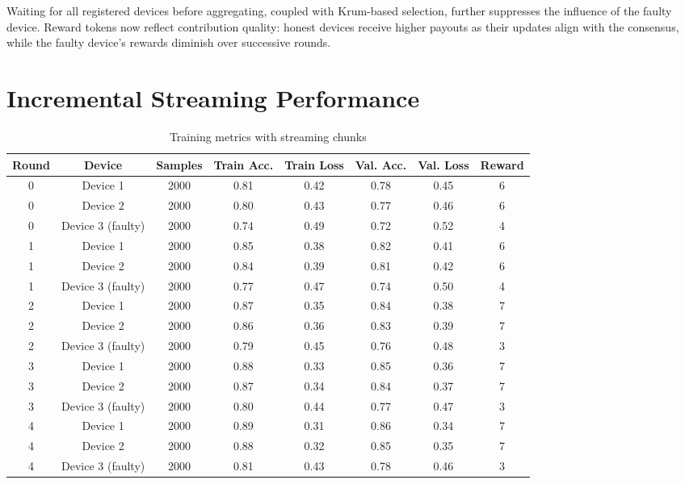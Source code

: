 Waiting for all registered devices before aggregating, coupled with Krum-based selection, further suppresses the influence of the faulty device. Reward tokens now reflect contribution quality: honest devices receive higher payouts as their updates align with the consensus, while the faulty device's rewards diminish over successive rounds.

\section{Incremental Streaming Performance}

\begin{table}[h!]
    \centering
    \caption{Training metrics with streaming chunks}
    \label{tab:streaming_chunks}
    \begin{tabular}{c c c c c c c c}
        \toprule
        \textbf{Round} & \textbf{Device} & \textbf{Samples} & \textbf{Train Acc.} & \textbf{Train Loss} & \textbf{Val. Acc.} & \textbf{Val. Loss} & \textbf{Reward} \\
        \midrule
        0 & Device 1 & 2000 & 0.81 & 0.42 & 0.78 & 0.45 & 6 \\
        0 & Device 2 & 2000 & 0.80 & 0.43 & 0.77 & 0.46 & 6 \\
        0 & Device 3 (faulty) & 2000 & 0.74 & 0.49 & 0.72 & 0.52 & 4 \\
        1 & Device 1 & 2000 & 0.85 & 0.38 & 0.82 & 0.41 & 6 \\
        1 & Device 2 & 2000 & 0.84 & 0.39 & 0.81 & 0.42 & 6 \\
        1 & Device 3 (faulty) & 2000 & 0.77 & 0.47 & 0.74 & 0.50 & 4 \\
        2 & Device 1 & 2000 & 0.87 & 0.35 & 0.84 & 0.38 & 7 \\
        2 & Device 2 & 2000 & 0.86 & 0.36 & 0.83 & 0.39 & 7 \\
        2 & Device 3 (faulty) & 2000 & 0.79 & 0.45 & 0.76 & 0.48 & 3 \\
        3 & Device 1 & 2000 & 0.88 & 0.33 & 0.85 & 0.36 & 7 \\
        3 & Device 2 & 2000 & 0.87 & 0.34 & 0.84 & 0.37 & 7 \\
        3 & Device 3 (faulty) & 2000 & 0.80 & 0.44 & 0.77 & 0.47 & 3 \\
        4 & Device 1 & 2000 & 0.89 & 0.31 & 0.86 & 0.34 & 7 \\
        4 & Device 2 & 2000 & 0.88 & 0.32 & 0.85 & 0.35 & 7 \\
        4 & Device 3 (faulty) & 2000 & 0.81 & 0.43 & 0.78 & 0.46 & 3 \\
        \bottomrule
    \end{tabular}
\end{table}

